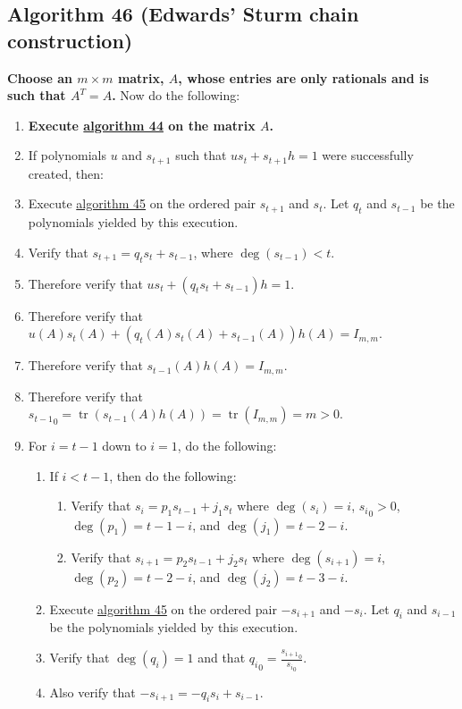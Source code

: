\documentclass[twocolumn]{article}
\DeclareMathOperator{\tr}{tr}
\begin{document}
		\subsection{Algorithm 46 (Edwards' Sturm chain construction)}\label{sec:algorithm 46}
			\textbf{Choose an $m\times m$ matrix, $A$, whose entries are only rationals and is such that $A^T=A$.} Now do the following:
			\begin{enumerate}
				\item \textbf{Execute \hyperref[sec:algorithm 44]{algorithm 44} on the matrix $A$.}
				\item If polynomials $u$ and $s_{t+1}$ such that $us_t+s_{t+1}h=1$ were successfully created, then:
				\item Execute \hyperref[sec:algorithm 45]{algorithm 45} on the ordered pair $s_{t+1}$ and $s_t$. Let $q_t$ and $s_{t-1}$ be the polynomials yielded by this execution.
				\item Verify that $s_{t+1}=q_ts_t+s_{t-1}$, where $\deg(s_{t-1})<t$.
				\item Therefore verify that $us_t+(q_ts_t+s_{t-1})h=1$.
				\item Therefore verify that $u(A)s_t(A)+(q_t(A)s_t(A)+s_{t-1}(A))h(A)=I_{m,m}$.
				\item Therefore verify that $s_{t-1}(A)h(A)=I_{m,m}$.
				\item Therefore verify that ${s_{t-1}}_0=\tr(s_{t-1}(A)h(A))=\tr(I_{m,m})=m>0$.
				\item For $i=t-1$ down to $i=1$, do the following:
				\begin{enumerate}
					\item If $i<t-1$, then do the following:
					\begin{enumerate}
						\item Verify that $s_i=p_1s_{t-1}+j_1s_t$ where $\deg(s_i)=i$, ${s_i}_0>0$, $\deg(p_1)=t-1-i$, and $\deg(j_1)=t-2-i$.
						\item Verify that $s_{i+1}=p_2s_{t-1}+j_2s_t$ where $\deg(s_{i+1})=i$, $\deg(p_2)=t-2-i$, and $\deg(j_2)=t-3-i$.
					\end{enumerate}
					\item Execute \hyperref[sec:algorithm 45]{algorithm 45} on the ordered pair $-s_{i+1}$ and $-s_i$. Let $q_i$ and $s_{i-1}$ be the polynomials yielded by this execution.
					\item Verify that $\deg(q_i)=1$ and that ${q_i}_0=\frac{{s_{i+1}}_0}{{s_i}_0}$.
					\item Also verify that $-s_{i+1}=-q_is_i+s_{i-1}$.

\end{enumerate}
\end{enumerate}
\end{document}
